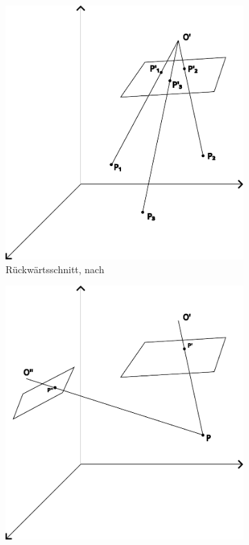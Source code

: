 \documentclass[./00PhotoBox.tex]{subfiles}
\begin{document}
\begin{figure}
    \centering
    \begin{subfigure}{0.45\textwidth}
        \includegraphics[width=0.9\linewidth]{img/rueckwaertsschnitt.pdf}
        \centering
        \caption{Rückwärtsschnitt, nach \citealt[S. 284]{luhmann}} %
        \label{img:rueckwaertsschnitt} %
    \end{subfigure}
    \begin{subfigure}{0.45\textwidth}
        \includegraphics[width=0.9\linewidth]{img/vorwaertsschnitt.pdf}

\end{subfigure}
\end{figure}
\end{document}
